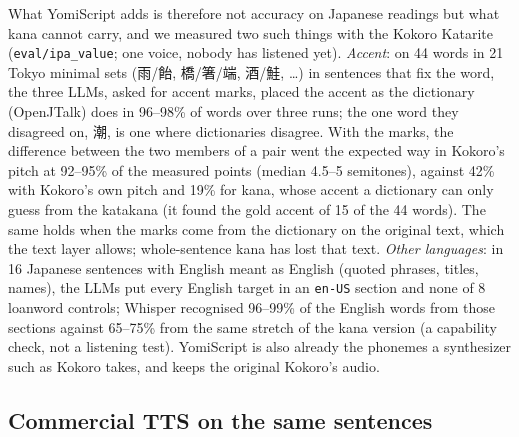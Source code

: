 \documentclass[11pt,a4paper]{article}
\newcommand{\ys}[1]{\mbox{\texttt{#1}}}
\begin{document}
What YomiScript adds is therefore not accuracy on Japanese readings but what kana cannot carry, and we measured two
such things with the Kokoro Katarite (\texttt{eval/ipa\_value}; one voice, nobody has listened yet). \emph{Accent}: on
44 words in 21 Tokyo minimal sets (雨/飴, 橋/箸/端, 酒/鮭, \dots) in sentences that fix the word, the three LLMs, asked
for accent marks, placed the accent as the dictionary (OpenJTalk) does in 96--98\% of words over three runs; the one
word they disagreed on, 潮, is one where dictionaries disagree. With the marks, the difference between the two members
of a pair went the expected way in Kokoro's pitch at 92--95\% of the measured points (median 4.5--5 semitones), against
42\% with Kokoro's own pitch and 19\% for kana, whose accent a dictionary can only guess from the katakana (it found
the gold accent of 15 of the 44 words). The same holds when the marks come from the dictionary on the original text,
which the text layer allows; whole-sentence kana has lost that text. \emph{Other languages}: in 16 Japanese sentences
with English meant as English (quoted phrases, titles, names), the LLMs put every English target in an \ys{en-US}
section and none of 8 loanword controls; Whisper recognised 96--99\% of the English words from those sections against
65--75\% from the same stretch of the kana version (a capability check, not a listening test). YomiScript is also
already the phonemes a synthesizer such as Kokoro takes, and keeps the original Kokoro's audio.

\subsection{Commercial TTS on the same sentences}\label{sec:commercial}
\end{document}
